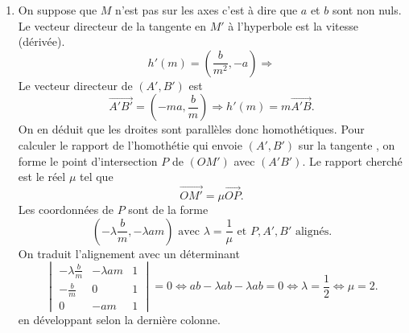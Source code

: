 \begin{enumerate}
\begin{enumerate}
  \item On suppose que $M$ n'est pas sur les axes c'est à dire que $a$ et $b$ sont non nuls.\newline
  Le vecteur directeur de la tangente en $M'$ à l'hyperbole est la vitesse (dérivée).
  \begin{displaymath}
   h'(m) = \left( \frac{b}{m^2}, -a\right) \Rightarrow
  \end{displaymath}
  Le vecteur directeur de $(A',B')$ est
  \begin{displaymath}
   \overrightarrow{A'B'} = (-ma, \frac{b}{m}) \Rightarrow h'(m) = m \overrightarrow{A'B}.
  \end{displaymath}
  On en déduit que les droites sont parallèles donc homothétiques. Pour calculer le rapport de l'homothétie qui envoie $(A',B')$ sur la tangente , on forme le point d'intersection $P$ de $(OM')$ avec $(A'B')$. Le rapport cherché est le réel $\mu$ tel que
  \begin{displaymath}
   \overrightarrow{OM'} = \mu \overrightarrow{OP}.
  \end{displaymath}
  Les coordonnées de $P$ sont de la forme
  \begin{displaymath}
   \left( -\lambda \frac{b}{m}, - \lambda a m \right) \text{ avec } \lambda = \frac{1}{\mu} \text{ et } P, A', B' \text{ alignés.}
  \end{displaymath}
  On traduit l'alignement avec un déterminant
  \begin{displaymath}
   \begin{vmatrix}
    -\lambda \frac{b}{m} & - \lambda a m & 1 \\
    -\frac{b}{m}         & 0             & 1 \\
    0                    & -am           & 1
   \end{vmatrix}
   =0
   \Leftrightarrow
   ab - \lambda ab - \lambda ab = 0
   \Leftrightarrow \lambda = \frac{1}{2} \Leftrightarrow \mu = 2.
  \end{displaymath}
  en développant selon la dernière colonne.
 \end{enumerate}

\end{enumerate}
